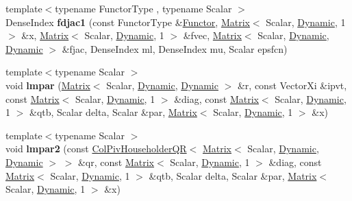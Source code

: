 \begin{DoxyCompactItemize}
{\footnotesize template$<$typename Functor\+Type , typename Scalar $>$ }\\Dense\+Index {\bfseries fdjac1} (const Functor\+Type \&\hyperlink{struct_functor}{Functor}, \hyperlink{group___core___module_class_eigen_1_1_matrix}{Matrix}$<$ Scalar, \hyperlink{namespace_eigen_ad81fa7195215a0ce30017dfac309f0b2}{Dynamic}, 1 $>$ \&x, \hyperlink{group___core___module_class_eigen_1_1_matrix}{Matrix}$<$ Scalar, \hyperlink{namespace_eigen_ad81fa7195215a0ce30017dfac309f0b2}{Dynamic}, 1 $>$ \&fvec, \hyperlink{group___core___module_class_eigen_1_1_matrix}{Matrix}$<$ Scalar, \hyperlink{namespace_eigen_ad81fa7195215a0ce30017dfac309f0b2}{Dynamic}, \hyperlink{namespace_eigen_ad81fa7195215a0ce30017dfac309f0b2}{Dynamic} $>$ \&fjac, Dense\+Index ml, Dense\+Index mu, Scalar epsfcn)
\item 
\mbox{\label{namespace_eigen_1_1internal_ace55f5e362285ba23845e81f6aeb7c3d}} 
{\footnotesize template$<$typename Scalar $>$ }\\void {\bfseries lmpar} (\hyperlink{group___core___module_class_eigen_1_1_matrix}{Matrix}$<$ Scalar, \hyperlink{namespace_eigen_ad81fa7195215a0ce30017dfac309f0b2}{Dynamic}, \hyperlink{namespace_eigen_ad81fa7195215a0ce30017dfac309f0b2}{Dynamic} $>$ \&r, const Vector\+Xi \&ipvt, const \hyperlink{group___core___module_class_eigen_1_1_matrix}{Matrix}$<$ Scalar, \hyperlink{namespace_eigen_ad81fa7195215a0ce30017dfac309f0b2}{Dynamic}, 1 $>$ \&diag, const \hyperlink{group___core___module_class_eigen_1_1_matrix}{Matrix}$<$ Scalar, \hyperlink{namespace_eigen_ad81fa7195215a0ce30017dfac309f0b2}{Dynamic}, 1 $>$ \&qtb, Scalar delta, Scalar \&par, \hyperlink{group___core___module_class_eigen_1_1_matrix}{Matrix}$<$ Scalar, \hyperlink{namespace_eigen_ad81fa7195215a0ce30017dfac309f0b2}{Dynamic}, 1 $>$ \&x)
\item 
\mbox{\label{namespace_eigen_1_1internal_aed2fa0ec22bcc867b9a8115c0c5f1cf5}} 
{\footnotesize template$<$typename Scalar $>$ }\\void {\bfseries lmpar2} (const \hyperlink{group___q_r___module_class_eigen_1_1_col_piv_householder_q_r}{Col\+Piv\+Householder\+QR}$<$ \hyperlink{group___core___module_class_eigen_1_1_matrix}{Matrix}$<$ Scalar, \hyperlink{namespace_eigen_ad81fa7195215a0ce30017dfac309f0b2}{Dynamic}, \hyperlink{namespace_eigen_ad81fa7195215a0ce30017dfac309f0b2}{Dynamic} $>$ $>$ \&qr, const \hyperlink{group___core___module_class_eigen_1_1_matrix}{Matrix}$<$ Scalar, \hyperlink{namespace_eigen_ad81fa7195215a0ce30017dfac309f0b2}{Dynamic}, 1 $>$ \&diag, const \hyperlink{group___core___module_class_eigen_1_1_matrix}{Matrix}$<$ Scalar, \hyperlink{namespace_eigen_ad81fa7195215a0ce30017dfac309f0b2}{Dynamic}, 1 $>$ \&qtb, Scalar delta, Scalar \&par, \hyperlink{group___core___module_class_eigen_1_1_matrix}{Matrix}$<$ Scalar, \hyperlink{namespace_eigen_ad81fa7195215a0ce30017dfac309f0b2}{Dynamic}, 1 $>$ \&x)

\end{DoxyCompactItemize}
